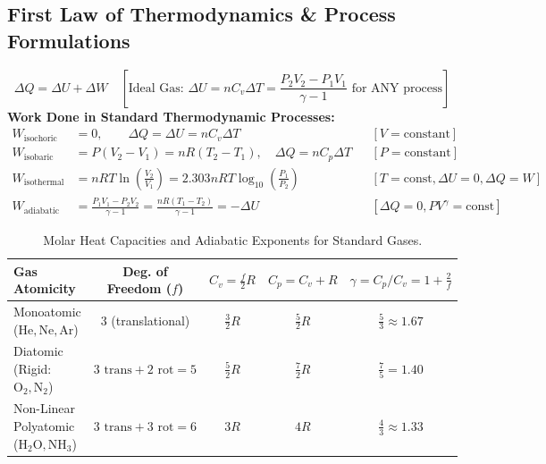 \documentclass[11pt,a4paper]{article}
\begin{document}
\subsection{First Law of Thermodynamics \& Process Formulations}

\begin{formulabox}
\begin{equation}
  \Delta Q = \Delta U + \Delta W \quad [\text{Ideal Gas: } \Delta U = n C_v \Delta T = \frac{P_2V_2 - P_1V_1}{\gamma - 1} \text{ for ANY process}]
\end{equation}
\textbf{Work Done in Standard Thermodynamic Processes:}
\begin{align}
  W_{\text{isochoric}} &= 0, \qquad \Delta Q = \Delta U = n C_v \Delta T && [V = \text{constant}] \\
  W_{\text{isobaric}} &= P(V_2 - V_1) = n R(T_2 - T_1), \quad \Delta Q = n C_p \Delta T && [P = \text{constant}] \\
  W_{\text{isothermal}} &= n R T \ln\left(\frac{V_2}{V_1}\right) = 2.303 n R T \log_{10}\left(\frac{P_1}{P_2}\right) && [T = \text{const}, \Delta U = 0, \Delta Q = W] \\
  W_{\text{adiabatic}} &= \frac{P_1 V_1 - P_2 V_2}{\gamma - 1} = \frac{n R(T_1 - T_2)}{\gamma - 1} = -\Delta U && [\Delta Q = 0, P V^\gamma = \text{const}]
\end{align}
\end{formulabox}

\begin{table}[htbp]
\centering
\small
\renewcommand{\arraystretch}{1.2}
\begin{tabularx}{\textwidth}{L c c c c}
\toprule
\textbf{Gas Atomicity} & \textbf{Deg. of Freedom ($f$)} & $C_v = \frac{f}{2}R$ & $C_p = C_v + R$ & $\gamma = C_p/C_v = 1 + \frac{2}{f}$ \\
\midrule
Monoatomic ($\text{He}, \text{Ne}, \text{Ar}$) & $3$ (translational) & $\frac{3}{2}R$ & $\frac{5}{2}R$ & $\frac{5}{3} \approx 1.67$ \\
Diatomic (Rigid: $\text{O}_2, \text{N}_2$) & $3\text{ trans} + 2\text{ rot} = 5$ & $\frac{5}{2}R$ & $\frac{7}{2}R$ & $\frac{7}{5} = 1.40$ \\
Non-Linear Polyatomic ($\text{H}_2\text{O}, \text{NH}_3$) & $3\text{ trans} + 3\text{ rot} = 6$ & $3R$ & $4R$ & $\frac{4}{3} \approx 1.33$ \\
\bottomrule
\end{tabularx}
\caption{Molar Heat Capacities and Adiabatic Exponents for Standard Gases.}
\end{table}
\end{document}
